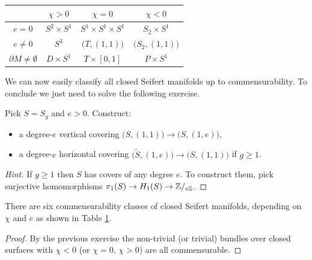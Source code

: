 \begin{table}
\begin{center}
\begin{tabular}{c||ccc}
        & \phantom{\Big|} $\chi>0$ & $\chi = 0$ & $\chi<0$ \\
 \hline \hline
 $e=0$ & \phantom{\Big|} $S^2\times S^1$ & $S^1\times S^1\times S^1$ & $S_2 \times S^1$ \\
 $e\neq 0$ & \phantom{\big|} $S^3$ & $\big(T,(1,1)\big)$ & $\big(S_2,(1,1)\big)$ \\
 $\partial M\neq \emptyset$ & \phantom{\Big|} $D\times S^1$ & $T \times [0,1]$ & $P \times S^1$
\end{tabular}
\vspace{.2 cm}
\label{commensurability:table}
\end{center}
\end{table}

We can now easily classify all closed Seifert manifolds up to commensurability. To conclude we just need to solve the following exercise.

\begin{ex} \label{e:construct:ex}
Pick $S=S_g$ and $e>0$. Construct:
\begin{itemize}
\item a degree-$e$ vertical covering $\big(S,(1,1)\big)\to \big(S,(1,e)\big)$,
\item a degree-$e$ horizontal covering $\big(\tilde S,(1,e)\big) \to \big(S,(1,1)\big)$ if $g\geqslant 1$.
\end{itemize}
\end{ex}
\begin{proof}[Hint] If $g\geqslant 1$ then $S$ has covers of any degree $e$. To construct them, pick surjective homomorphisms $\pi_1(S)\to H_1(S) \to \mathbb{Z}/_{e\mathbb{Z}}$.
\end{proof}

\begin{cor}
There are six commensurability classes of closed Seifert manifolds, depending on $\chi$ and $e$ as shown in Table \ref{commensurability:table}.
\end{cor}
\begin{proof}
By the previous exercise the non-trivial (or trivial) bundles over closed surfaces with $\chi < 0$ (or $\chi =0$, $\chi >0$) are all commensurable.
\end{proof}

